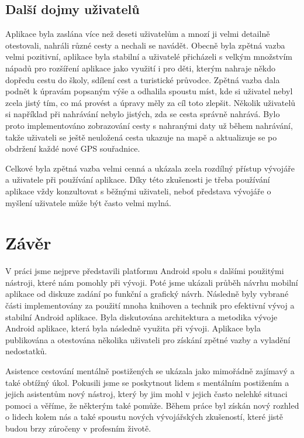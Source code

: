 \documentclass[czech,master,public,dept460,male,java,cpdeclaration]{diploma}
\begin{document}
\subsection{Další dojmy uživatelů}
Aplikace byla zaslána více než deseti uživatelům a mnozí ji velmi detailně otestovali, nahráli různé cesty
a nechali se navádět. Obecně byla zpětná vazba velmi pozitivní, aplikace byla stabilní a uživatelé přicházeli s velkým množstvím
nápadů pro rozšíření aplikace jako využití i pro děti, kterým nahraje někdo dopředu cestu do školy, sdílení cest
a turistické průvodce.
Zpětná vazba dala podnět k úpravám popsaným výše a odhalila spoustu míst, kde si uživatel nebyl
zcela jistý tím, co má provést a úpravy měly za cíl toto zlepšit.
Několik uživatelů si například při nahrávání nebylo jistých, zda se cesta správně nahrává. Bylo proto implementováno
zobrazování cesty s nahranými daty už během nahrávání, takže uživateli se ještě neuložená cesta ukazuje na
mapě a aktualizuje se po obdržení každé nové GPS souřadnice.

Celkové byla zpětná vazba velmi cenná a ukázala zcela rozdílný přístup vývojáře a uživatele při používání
aplikace. Díky této zkušenosti je třeba používání aplikace vždy konzultovat s běžnými uživateli, neboť
představa vývojáře o myšlení uživatele může být často velmi mylná.


\section{Závěr}
V práci jsme nejprve představili platformu Android spolu s dalšími použitými nástroji, které nám pomohly při vývoji.
Poté jsme ukázali průběh návrhu mobilní aplikace od diskuze zadání po funkční a grafický návrh.
Následně byly vybrané části implementovány za použití mnoha knihoven a technik
pro efektivní vývoj a stabilní Android aplikace. Byla diskutována architektura a metodika vývoje Android aplikace,
která byla následně využita při vývoji. Aplikace byla publikována a otestována několika uživateli pro
 získání zpětné vazby a vyladění nedostatků.

Asistence cestování mentálně postižených se ukázala jako mimořádně zajímavý a také obtížný úkol.
Pokusili jsme se poskytnout lidem s mentálním postižením a jejich asistentům nový nástroj, který by
jim mohl v jejich často nelehké situaci pomoci a věříme, že některým také pomůže. Během práce byl získán
nový rozhled o lidech kolem nás a také spoustu nových vývojářských zkušeností, které
jistě budou brzy zúročeny v profesním životě.
\end{document}
